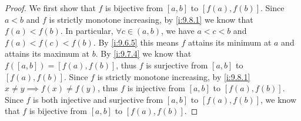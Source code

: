 \begin{proof}
  We first show that \(f\) is bijective from \([a, b]\) to \([f(a), f(b)]\).
  Since \(a < b\) and \(f\) is strictly monotone increasing, by \cref{i:9.8.1} we know that \(f(a) < f(b)\).
  In particular, \(\forall c \in (a, b)\), we have \(a < c < b\) and \(f(a) < f(c) < f(b)\).
  By \cref{i:9.6.5} this means \(f\) attains its minimum at \(a\) and attains its maximum at \(b\).
  By \cref{i:9.7.4} we know that \(f([a, b]) = [f(a), f(b)]\), thus \(f\) is surjective from \([a, b]\) to \([f(a), f(b)]\).
  Since \(f\) is strictly monotone increasing, by \cref{i:9.8.1} \(x \neq y \implies f(x) \neq f(y)\), thus \(f\) is injective from \([a, b]\) to \([f(a), f(b)]\).
  Since \(f\) is both injective and surjective from \([a, b]\) to \([f(a), f(b)]\), we know that \(f\) is bijective from \([a, b]\) to \([f(a), f(b)]\).


\end{proof}
